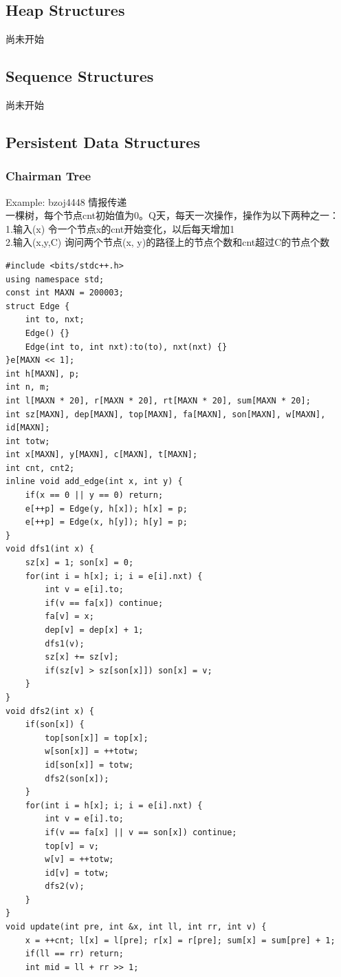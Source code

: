 \documentclass[10pt]{ctexart}
\begin{document}
{\subsection{Heap Structures}
尚未开始
\subsection{Sequence Structures}
尚未开始
\subsection{Persistent Data Structures}
\subsubsection{Chairman Tree}
Example: bzoj4448 情报传递 \\
一棵树，每个节点cnt初始值为0。Q天，每天一次操作，操作为以下两种之一：\\
1.输入(x) 令一个节点x的cnt开始变化，以后每天增加1\\
2.输入(x,y,C) 询问两个节点(x, y)的路径上的节点个数和cnt超过C的节点个数\\
\begin{lstlisting}
#include <bits/stdc++.h>
using namespace std;
const int MAXN = 200003;
struct Edge {
    int to, nxt;
    Edge() {}
    Edge(int to, int nxt):to(to), nxt(nxt) {}
}e[MAXN << 1];
int h[MAXN], p;
int n, m;
int l[MAXN * 20], r[MAXN * 20], rt[MAXN * 20], sum[MAXN * 20];
int sz[MAXN], dep[MAXN], top[MAXN], fa[MAXN], son[MAXN], w[MAXN], id[MAXN];
int totw;
int x[MAXN], y[MAXN], c[MAXN], t[MAXN];
int cnt, cnt2;
inline void add_edge(int x, int y) {
    if(x == 0 || y == 0) return;
    e[++p] = Edge(y, h[x]); h[x] = p;
    e[++p] = Edge(x, h[y]); h[y] = p;
}
void dfs1(int x) {
    sz[x] = 1; son[x] = 0;
    for(int i = h[x]; i; i = e[i].nxt) {
        int v = e[i].to;
        if(v == fa[x]) continue;
        fa[v] = x;
        dep[v] = dep[x] + 1;
        dfs1(v);
        sz[x] += sz[v];
        if(sz[v] > sz[son[x]]) son[x] = v;
    }
}
void dfs2(int x) {
    if(son[x]) {
        top[son[x]] = top[x];
        w[son[x]] = ++totw;
        id[son[x]] = totw;
        dfs2(son[x]);
    }
    for(int i = h[x]; i; i = e[i].nxt) {
        int v = e[i].to;
        if(v == fa[x] || v == son[x]) continue;
        top[v] = v;
        w[v] = ++totw;
        id[v] = totw;
        dfs2(v);
    }
}
void update(int pre, int &x, int ll, int rr, int v) {
    x = ++cnt; l[x] = l[pre]; r[x] = r[pre]; sum[x] = sum[pre] + 1;
    if(ll == rr) return;
    int mid = ll + rr >> 1;

\end{lstlisting}}
\end{document}

